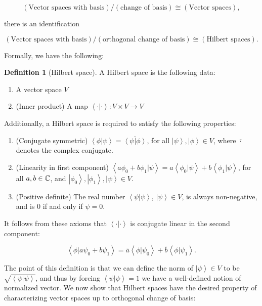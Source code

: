 \documentclass{article}
\theoremstyle{definition}
\newtheorem*{definition}{Definition}
\numberwithin{figure}{section}
\begin{document}
$$
\left(\text{Vector spaces with basis}\right)/\left(\text{change of basis}\right)\cong
\left(\text{Vector spaces}\right),
$$

there is an identification

$$
\left(\text{Vector spaces with basis}\right)/\left(\text{orthogonal change of basis}\right)\cong
\left(\text{Hilbert spaces}\right).
$$

Formally, we have the following:

\begin{definition}[Hilbert space] A Hilbert space is the following data:

\begin{enumerate}
\item A vector space $V$
\item (Inner product) A map $\left<\cdot |\cdot \right>:V\times V\to V$
\end{enumerate}

Additionally, a Hilbert space is required to satisfy the following properties:

\begin{enumerate}
\item (Conjugate symmetric) $\left<\phi |\psi \right>=\overline{\left<\psi| \phi\right>}$, for all $\left|\psi\right>,\left|\phi\right>\in V$, where $\overline{\cdot}$ denotes the complex conjugate.
\item (Linearity in first component) $\left<a\phi_0+b\phi_1|\psi\right>=a\left<\phi_0|\psi\right>+b\left<\phi_1|\psi\right>$, for all $a,b\in \mathbb{C}$, and $\left|\phi_0\right>,\left|\phi_1\right>,\left|\psi\right>\in V$.
\item (Positive definite) The real number $\left<\psi|\psi\right>$, $\left|\psi\right>\in V$,  is always non-negative, and is $0$ if and only if $\psi=0$.
\end{enumerate}

\raggedleft\qedsymbol{}
\end{definition}

It follows from these axioms that $\left<\cdot | \cdot \right>$ is conjugate linear in the second component:

$$\left<\phi|a\psi_0+b\psi_1\right>=\overline{a}\left<\phi|\psi_0\right>+\overline{b}\left<\phi|\psi_1\right>.$$

The point of this definition is that we can define the norm of $\left|\psi\right>\in V$ to be $\sqrt{\left<\psi|\psi\right>}$, and thus by forcing $\left<\psi |\psi\right>=1$ we have a well-defined notion of normalized vector. We now show that Hilbert spaces have the desired property of characterizing vector spaces up to orthogonal change of basis:
\end{document}

